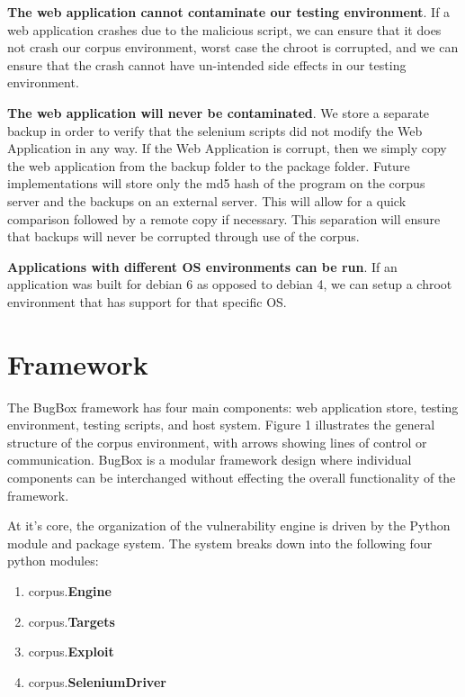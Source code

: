 \documentclass[letterpaper,twocolumn,10pt]{article}
\begin{document}
{\bf The web application cannot contaminate our testing environment}.  If a web application crashes due to the malicious script, we can ensure that it does not crash our corpus environment, worst case the chroot is corrupted, and we can ensure that the crash cannot have un-intended side effects in our testing environment.  

{\bf The web application will never be contaminated}.  We store a separate backup in order to verify that the selenium scripts did not modify the Web Application in any way.  If the Web Application is corrupt, then we simply copy the web application from the backup folder to the package folder.  Future implementations will store only the md5 hash of the program on the corpus server and the backups on an external server.  This will allow for a quick comparison followed by a remote copy if necessary.  This separation will ensure that backups will never be corrupted through use of the corpus.  

{\bf Applications with different OS environments can be run}.  If an application was built for debian 6 as opposed to debian 4, we can setup a chroot environment that has support for that specific OS.

\section{Framework}

The BugBox framework has four main components: web application store, testing environment, testing scripts, and host system. Figure 1 illustrates the general structure of the corpus environment, with arrows showing lines of control or communication.  BugBox is a modular framework design where individual components can be interchanged without effecting the overall functionality of the framework.\par
At it's core, the organization of the vulnerability engine is driven by the Python module and package system. The system breaks down into the following four python modules:
\begin{center}
 \begin{enumerate}
   \item corpus.{\bf Engine}\\
   \item corpus.{\bf Targets}\\
   \item corpus.{\bf Exploit}\\
   \item corpus.{\bf SeleniumDriver}\\
 \end{enumerate}
\end{center}
   
\end{document}
